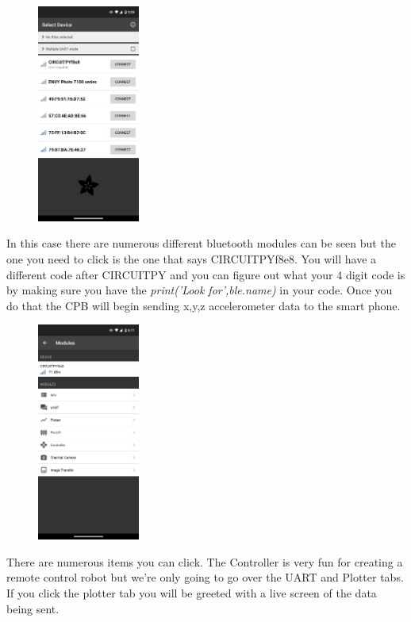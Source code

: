 \begin{figure}[H]
  \begin{center}
    \includegraphics[width=0.3\textwidth]{Figures/phoneapp1.png}
  \end{center}
\end{figure}
In this case there are numerous different bluetooth modules can be seen but the one you need to click is the one that says CIRCUITPYf8e8. You will have a different code after CIRCUITPY and you can figure out what your 4 digit code is by making sure you have the {\it print('Look for',ble.name)} in your code. Once you do that the CPB will begin sending x,y,z accelerometer data to the smart phone. 
\begin{figure}[H]
  \begin{center}
    \includegraphics[width=0.3\textwidth]{Figures/phoneapp2.png}
  \end{center}
\end{figure}
There are numerous items you can click. The Controller is very fun for creating a remote control robot but we're only going to go over the UART and Plotter tabs. If you click the plotter tab you will be greeted with a live screen of the data being sent.
